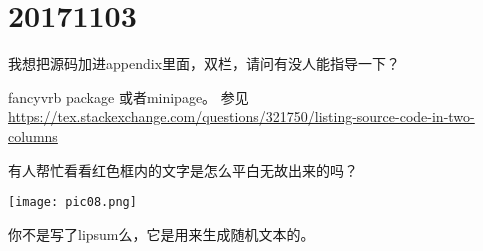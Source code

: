 \documentclass[QAofGroup.tex]{subfiles}
\begin{document}
%
%

\chapter{20171103}\label{ch1103}

\begin{qst}\label{Q2017110301}
我想把源码加进appendix里面，双栏，请问有没人能指导一下？
\end{qst}
\ans fancyvrb package 或者minipage。
参见\url{https://tex.stackexchange.com/questions/321750/listing-source-code-in-two-columns}

\begin{qst}\label{Q2017110302}
有人帮忙看看红色框内的文字是怎么平白无故出来的吗？

\texttt{[image: pic08.png]}
\end{qst}
\ans 你不是写了lipsum么，它是用来生成随机文本的。
\end{document}
